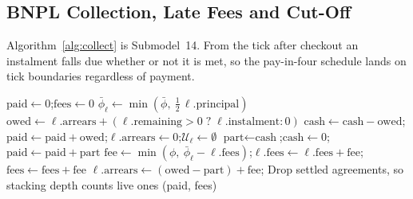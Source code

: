 \subsection{\texorpdfstring{\acs{BNPL}}{BNPL} Collection, Late Fees and Cut-Off}\label{app:main-collect}

Algorithm~\ref{alg:collect} is Submodel~14. From the tick after checkout an instalment falls due
whether or not it is met, so the pay-in-four schedule lands on tick boundaries regardless of
payment.

\begin{algorithm}[!htbp]
\caption{\ac{BNPL} collection}
\label{alg:collect}
\begin{algorithmic}
 
    \State $\text{paid} \gets 0$;\quad $\text{fees} \gets 0$
        \State $\bar\phi_\ell \gets \min(\bar\phi,\ \tfrac{1}{2}\, \ell.\text{principal})$ 
        \State $\text{owed} \gets \ell.\text{arrears} + (\ell.\text{remaining} > 0 \;?\; \ell.\text{instalment} : 0)$
            \State $\text{cash} \gets \text{cash} - \text{owed}$;\quad $\text{paid} \gets \text{paid} + \text{owed}$;\quad $\ell.\text{arrears} \gets 0$;\quad $\mathcal{U}_\ell \gets \emptyset$
        \Else
            \State $\text{part} \gets \text{cash}$;\quad $\text{cash} \gets 0$;\quad $\text{paid} \gets \text{paid} + \text{part}$
            \State $\text{fee} \gets \min(\phi,\ \bar\phi_\ell - \ell.\text{fees})$;\quad $\ell.\text{fees} \gets \ell.\text{fees} + \text{fee}$;\quad $\text{fees} \gets \text{fees} + \text{fee}$
            \State $\ell.\text{arrears} \gets (\text{owed} - \text{part}) + \text{fee}$;\quad {}
        \EndIf
    \EndFor
    \State Drop settled agreements, so stacking depth counts live ones
    \State \Return (paid, fees)
\EndFunction
\end{algorithmic}
\end{algorithm}

